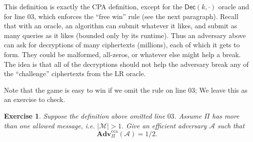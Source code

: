 \documentclass[11pt]{article}
\newtheorem{exercise}{Exercise}
\newcommand{\msgs}{\mathcal{M}}
\newcommand{\Dec}{\mathsf{Dec}}
\newcommand{\calA}{\mathcal{A}}
\newcommand{\Adv}{\mathbf{Adv}}
\newcommand{\AdvCCA}[2]{\Adv^{\mathrm{cca}}_{#1}({#2})}
\newcommand{\LR}{\mathrm{LR}}
\begin{document}
This definition is exactly the CPA definition, except for the $\Dec(k,\cdot)$
oracle and for line $03$, which enforces the ``free win'' rule (see the next
paragraph). Recall that with an oracle, an algorithm can submit whatever it
likes, and submit as many queries as it likes (bounded only by its runtime).
Thus an adversary above can ask for decryptions of many ciphertexts (millions),
each of which it gets to form. They could be malformed, all-zeros, or whatever
else might help a break. The idea is that all of the decryptions should not
help the adversary break any of the ``challenge'' ciphertexts from the $\LR$
oracle.


Note that the game is easy to win if we omit the rule on line $03$;
We leave this as an exercise to check.
\begin{exercise}
    Suppose the definition above omitted line $03$.  Assume $\Pi$ has more than
    one allowed message, i.e.  $|\msgs| > 1$. Give an efficient adversary
    $\calA$ such that
    \[
        \AdvCCA{\Pi}{\calA} = 1/2.
    \]
\end{exercise}
\end{document}
